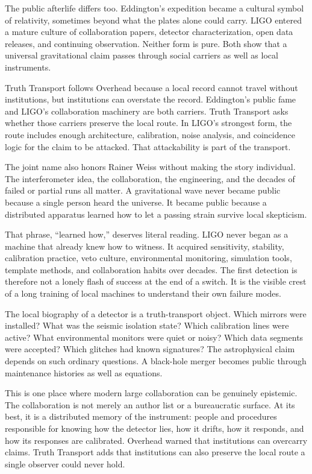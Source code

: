The public afterlife differs too. Eddington's expedition became a cultural
symbol of relativity, sometimes beyond what the plates alone could carry.
LIGO entered a mature culture of collaboration papers, detector
characterization, open data releases, and continuing observation. Neither
form is pure. Both show that a universal gravitational claim passes
through social carriers as well as local instruments.

Truth Transport follows Overhead because a local record cannot travel
without institutions, but institutions can overstate the record.
Eddington's public fame and LIGO's collaboration machinery are both
carriers. Truth Transport asks whether those carriers preserve the local
route. In LIGO's strongest form, the route includes enough architecture,
calibration, noise analysis, and coincidence logic for the claim to be
attacked. That attackability is part of the transport.

The joint name also honors Rainer Weiss without making the story
individual. The interferometer idea, the collaboration, the engineering,
and the decades of failed or partial runs all matter. A gravitational
wave never became public because a single person heard the universe. It
became public because a distributed apparatus learned how to let a
passing strain survive local skepticism.

That phrase, ``learned how,'' deserves literal reading. LIGO never began
as a machine that already knew how to witness. It acquired sensitivity,
stability, calibration practice, veto culture, environmental monitoring,
simulation tools, template methods, and collaboration habits over
decades. The first detection is therefore not a lonely flash of success
at the end of a switch. It is the visible crest of a long training of
local machines to understand their own failure modes.

The local biography of a detector is a truth-transport object. Which
mirrors were installed? What was the seismic isolation state? Which
calibration lines were active? What environmental monitors were quiet or
noisy? Which data segments were accepted? Which glitches had known
signatures? The astrophysical claim depends on such ordinary questions. A
black-hole merger becomes public through maintenance histories as well as
equations.

This is one place where modern large collaboration can be genuinely
epistemic. The collaboration is not merely an author list or a
bureaucratic surface. At its best, it is a distributed memory of the
instrument: people and procedures responsible for knowing how the
detector lies, how it drifts, how it responds, and how its responses are
calibrated. Overhead warned that institutions can overcarry claims. Truth
Transport adds that institutions can also preserve the local route a
single observer could never hold.

